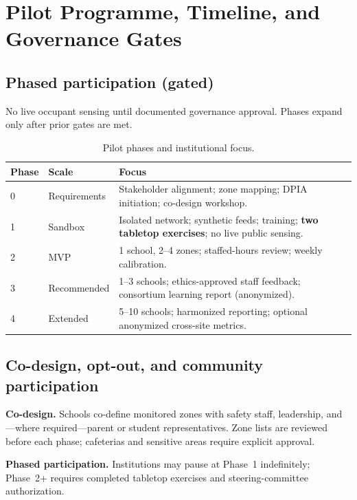 \section{Pilot Programme, Timeline, and Governance Gates}
\label{sec:pilot-programme}
\label{sec:pilot-methodology}
\label{sec:implementation-plan}

\subsection{Phased participation (gated)}

No live occupant sensing until documented governance approval.
Phases expand only after prior gates are met.

\begin{table}[htbp]
  \centering
  \caption{Pilot phases and institutional focus.}
  \label{tab:pilot-phases}
  \small
  \begin{tabular}{@{}p{1.2cm}p{2.0cm}p{5.8cm}@{}}
    \toprule
    Phase & Scale & Focus \\
    \midrule
    0 & Requirements &
      Stakeholder alignment; zone mapping; DPIA initiation; co-design workshop. \\
    1 & Sandbox &
      Isolated network; synthetic feeds; training; \textbf{two tabletop exercises}; no live public sensing. \\
    2 & MVP &
      1 school, 2--4 zones; staffed-hours review; weekly calibration. \\
    3 & Recommended &
      1--3 schools; ethics-approved staff feedback; consortium learning report (anonymized). \\
    4 & Extended &
      5--10 schools; harmonized reporting; optional anonymized cross-site metrics. \\
    \bottomrule
  \end{tabular}
\end{table}

\subsection{Co-design, opt-out, and community participation}

\textbf{Co-design.} Schools co-define monitored zones with safety staff, leadership, and---where
required---parent or student representatives.
Zone lists are reviewed before each phase; cafeterias and sensitive areas require explicit approval.

\textbf{Phased participation.} Institutions may pause at Phase~1 indefinitely; Phase~2+ requires
completed tabletop exercises and steering-committee authorization.


